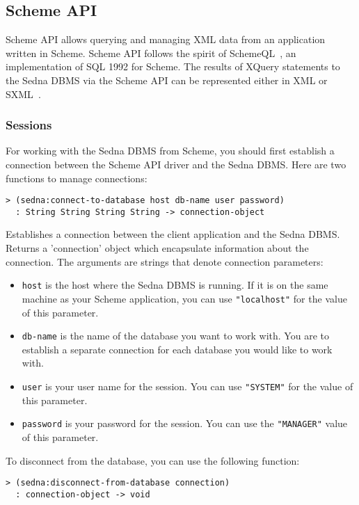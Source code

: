 \documentclass[a4paper,12pt]{article}
\newenvironment{citemize}
{\begin{itemize}
  \setlength{\itemsep}{0pt}
  \setlength{\parskip}{0pt}
  \setlength{\parsep}{0pt}}
{\end{itemize}}
\begin{document}
\subsection{Scheme API}

Scheme API allows querying and managing XML data from an application written in
Scheme. Scheme API follows the spirit of SchemeQL~\cite{paper:scheme-ql}, an
implementation of SQL 1992 for Scheme. The results of XQuery statements to the
Sedna DBMS via the Scheme API can be represented either in XML or
SXML~\cite{paper:sxml}.


\subsubsection{Sessions}
For working with the Sedna DBMS from Scheme, you should first establish a
connection between the Scheme API driver and the Sedna DBMS. Here are two
functions to manage connections:

\begin{verbatim}
> (sedna:connect-to-database host db-name user password)
  : String String String String -> connection-object
\end{verbatim}

Establishes a connection between the client application and the Sedna DBMS.
Returns a 'connection' object which encapsulate information about the
connection.
The arguments are strings that denote connection parameters:

\begin{citemize}
\item \texttt{host} is the host where the Sedna DBMS is running. If it is on the
same machine as your Scheme application, you can use \texttt{"localhost"} for
the value of this parameter.
\item \texttt{db-name} is the name of the database you want to work with. You
are to establish a separate connection for each database you would like to work
with.
\item \texttt{user} is your user name for the session. You can use
\texttt{"SYSTEM"} for the value of this parameter.
\item \texttt{password} is your password for the session. You can use the
\texttt{"MANAGER"} value of this parameter.
\end{citemize}

To disconnect from the database, you can use the following function:

\begin{verbatim}
> (sedna:disconnect-from-database connection)
  : connection-object -> void
\end{verbatim}
\end{document}
